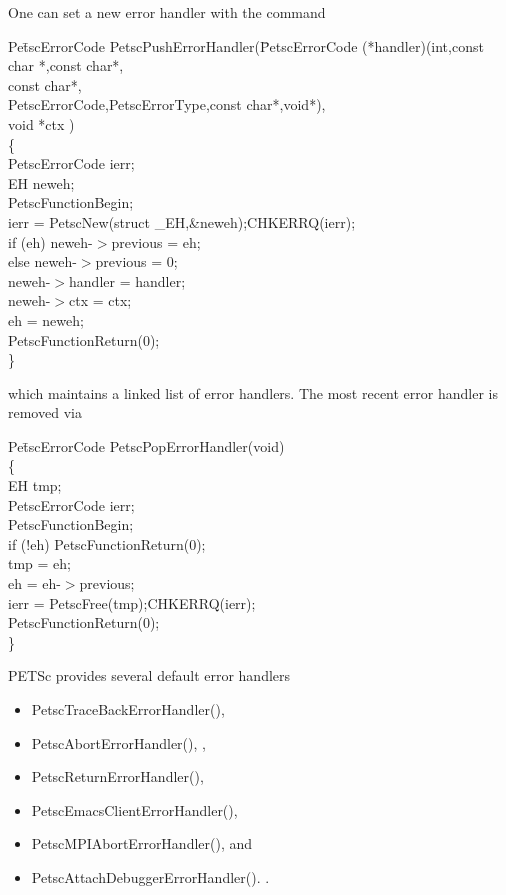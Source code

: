 \documentclass[twoside,12pt]{../sty/report_petsc}
\begin{document}
One can set a new error handler with the command
\begin{tabbing}
Pe\=tscErrorCode PetscPushErrorHandler(\=PetscErrorCode (*handler)(int,const char *,const char*,\\
   \> \>                       const char*,\\
    \> \>                      PetscErrorCode,PetscErrorType,const char*,void*),\\
   \>  \>                      void *ctx )\\
\{\\
  \> PetscErrorCode ierr;\\
  \>EH neweh; \\
  \>PetscFunctionBegin;\\
  \>ierr = PetscNew(struct \_EH,\&neweh);CHKERRQ(ierr);\\
  \>if (eh) {neweh-$>$previous = eh;} \\
  \>else    {neweh-$>$previous = 0;}\\
  \>neweh-$>$handler = handler;\\
  \>neweh-$>$ctx     = ctx;\\
  \>eh             = neweh;\\
  \>PetscFunctionReturn(0);\\
\}
\end{tabbing}
which maintains a linked list of error handlers. The most recent error handler is removed
via
\begin{tabbing}
Pe\=tscErrorCode PetscPopErrorHandler(void)\\
\{\\
 \> EH tmp;\\
\>  PetscErrorCode ierr;\\
\>  PetscFunctionBegin;\\
\>  if (!eh) PetscFunctionReturn(0);\\
\>  tmp = eh;\\
\>  eh  = eh-$>$previous;\\
\>  ierr = PetscFree(tmp);CHKERRQ(ierr);\\
\>  PetscFunctionReturn(0);\\
\}
\end{tabbing}

PETSc provides several default error handlers
\begin{itemize}
\item PetscTraceBackErrorHandler(), 
\item PetscAbortErrorHandler(), ,
\item PetscReturnErrorHandler(),
\item PetscEmacsClientErrorHandler(), 
\item PetscMPIAbortErrorHandler(), and
\item PetscAttachDebuggerErrorHandler(). .
\end{itemize}
\end{document}
